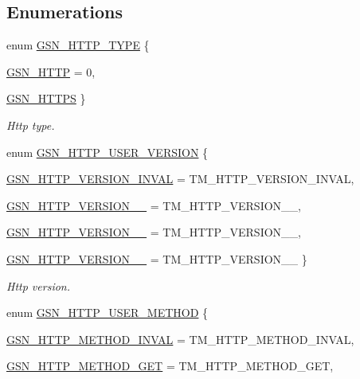 \subsection*{Enumerations}
\begin{DoxyCompactItemize}
\item 
enum \hyperlink{a00665_ga918ab72c19100d330e6d4854b0ac0612}{GSN\_\-HTTP\_\-TYPE} \{ \par
\hyperlink{a00665_gga918ab72c19100d330e6d4854b0ac0612ad5a7b6c3a067d880ff872f888605566a}{GSN\_\-HTTP} =  0, 
\par
\hyperlink{a00665_gga918ab72c19100d330e6d4854b0ac0612a6f80dcbc6ec710a3a2eee0b1708a4f31}{GSN\_\-HTTPS}
 \}
\begin{DoxyCompactList}\small\item\em Http type. \end{DoxyCompactList}\item 
enum \hyperlink{a00665_ga91d9306148208fe7d577c525bc69fb3b}{GSN\_\-HTTP\_\-USER\_\-VERSION} \{ \par
\hyperlink{a00665_gga91d9306148208fe7d577c525bc69fb3baf9cfc0ba598908f2ac7fab810fc9cadd}{GSN\_\-HTTP\_\-VERSION\_\-INVAL} =  TM\_\-HTTP\_\-VERSION\_\-INVAL, 
\par
\hyperlink{a00665_gga91d9306148208fe7d577c525bc69fb3bad3d536f3c887d1afaa75dab1b08c4c0e}{GSN\_\-HTTP\_\-VERSION\_\_} =  TM\_\-HTTP\_\-VERSION\_\_, 
\par
\hyperlink{a00665_gga91d9306148208fe7d577c525bc69fb3ba098eec93f90919d1eb1c7ca06ea3f7cb}{GSN\_\-HTTP\_\-VERSION\_\_} =  TM\_\-HTTP\_\-VERSION\_\_, 
\par
\hyperlink{a00665_gga91d9306148208fe7d577c525bc69fb3babb3791e6d15e2dfc0cf2411b7c78d9f5}{GSN\_\-HTTP\_\-VERSION\_\_} =  TM\_\-HTTP\_\-VERSION\_\_
 \}
\begin{DoxyCompactList}\small\item\em Http version. \end{DoxyCompactList}\item 
enum \hyperlink{a00665_ga23245efd9f2c5fead55d4b1f075bd6bf}{GSN\_\-HTTP\_\-USER\_\-METHOD} \{ \par
\hyperlink{a00665_gga23245efd9f2c5fead55d4b1f075bd6bfa62b503fb340f576919bded9653868e69}{GSN\_\-HTTP\_\-METHOD\_\-INVAL} =  TM\_\-HTTP\_\-METHOD\_\-INVAL, 
\par
\hyperlink{a00665_gga23245efd9f2c5fead55d4b1f075bd6bfa07b58e80949a13512a72f1fd80253cc5}{GSN\_\-HTTP\_\-METHOD\_\-GET} =  TM\_\-HTTP\_\-METHOD\_\-GET, 
\par

\end{DoxyCompactItemize}

